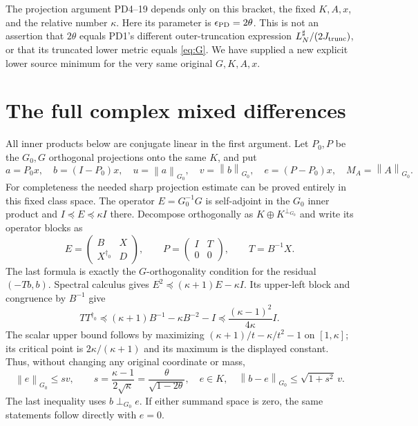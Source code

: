 \documentclass[11pt]{article}
\newcommand{\norm}[1]{\left\lVert#1\right\rVert}
\begin{document}
The projection argument PD4--19 depends only on this bracket,
the fixed $K,A,x$, and the relative number $\kappa$. Here its
parameter is $\epsilon_{\rm PD}=2\theta$. This is not an
assertion that $2\theta$ equals PD1's different outer-truncation
expression $L_N^\sharp/(2J_{\rm trunc})$, or that its truncated
lower metric equals \eqref{eq:G}. We have supplied a new explicit
lower source minimum for the very same original $G,K,A,x$.

\section{The full complex mixed differences}

All inner products below are conjugate linear in the first
argument. Let $P_0,P$ be the $G_0,G$ orthogonal projections
onto the same $K$, and put
\[
 a=P_0x,\quad b=(I-P_0)x,\quad
 u=\norm{a}_{G_0},\quad v=\norm{b}_{G_0},\quad
 e=(P-P_0)x,\quad M_A=\norm{A}_{G_0}.
\]
For completeness the needed sharp projection estimate can be
proved entirely in this fixed class space. The operator
$E=G_0^{-1}G$ is self-adjoint in the $G_0$ inner product and
$I\preceq E\preceq\kappa I$ there. Decompose orthogonally as
$K\oplus K^{\perp_{G_0}}$ and write its operator blocks as
\[
 E=\begin{pmatrix}B&X\\X^{\dagger_0}&D\end{pmatrix},\qquad
 P=\begin{pmatrix}I&T\\0&0\end{pmatrix},\qquad T=B^{-1}X.
\]
The last formula is exactly the $G$-orthogonality condition for
the residual $(-Tb,b)$. Spectral calculus gives
$E^2\preceq(\kappa+1)E-\kappa I$. Its upper-left block and
congruence by $B^{-1}$ give
\[
 TT^{\dagger_0}\preceq(\kappa+1)B^{-1}-\kappa B^{-2}-I
 \preceq\frac{(\kappa-1)^2}{4\kappa}I.
\]
The scalar upper bound follows by maximizing
$(\kappa+1)/t-\kappa/t^2-1$ on $[1,\kappa]$; its critical
point is $2\kappa/(\kappa+1)$ and its maximum is the displayed
constant. Thus, without changing any original coordinate or mass,
\begin{equation}\tag{MC8}\label{eq:projection}
 \norm{e}_{G_0}\le sv,\qquad
 s=\frac{\kappa-1}{2\sqrt\kappa}
   =\frac{\theta}{\sqrt{1-2\theta}},\quad e\in K,
 \quad\norm{b-e}_{G_0}\le\sqrt{1+s^2}\,v.
\end{equation}
The last inequality uses $b\perp_{G_0}e$. If either summand
space is zero, the same statements follow directly with $e=0$.
\end{document}
